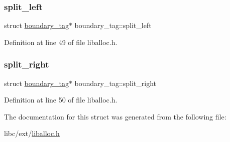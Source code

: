 \subsubsection{\texorpdfstring{split\+\_\+left}{split\_left}}
{\footnotesize\ttfamily struct \hyperlink{a00095}{boundary\+\_\+tag}$\ast$ boundary\+\_\+tag\+::split\+\_\+left}



Definition at line 49 of file liballoc.\+h.

\mbox{\label{a00095_a9d43c9c4ff5ae35908dcfed0aec1907a_a9d43c9c4ff5ae35908dcfed0aec1907a}} 
\subsubsection{\texorpdfstring{split\+\_\+right}{split\_right}}
{\footnotesize\ttfamily struct \hyperlink{a00095}{boundary\+\_\+tag}$\ast$ boundary\+\_\+tag\+::split\+\_\+right}



Definition at line 50 of file liballoc.\+h.



The documentation for this struct was generated from the following file\+:\begin{DoxyCompactItemize}
\item 
libc/ext/\hyperlink{a00026}{liballoc.\+h}\end{DoxyCompactItemize}
